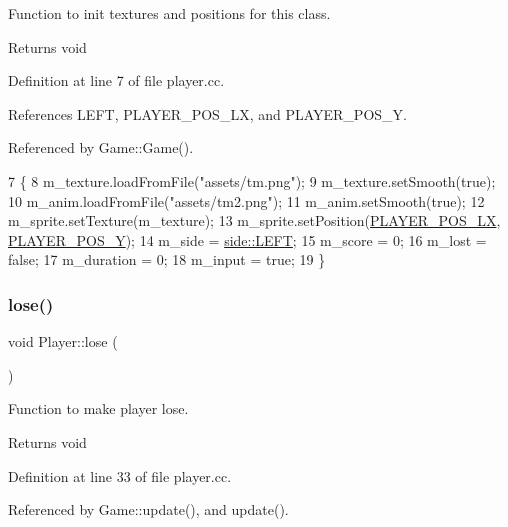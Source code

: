 Function to init textures and positions for this class. 

\begin{DoxyReturn}{Returns}
void 
\end{DoxyReturn}


Definition at line 7 of file player.\+cc.



References L\+E\+FT, P\+L\+A\+Y\+E\+R\+\_\+\+P\+O\+S\+\_\+\+LX, and P\+L\+A\+Y\+E\+R\+\_\+\+P\+O\+S\+\_\+Y.



Referenced by Game\+::\+Game().


\begin{DoxyCode}
7                   \{
8     m\_texture.loadFromFile(\textcolor{stringliteral}{"assets/tm.png"});
9     m\_texture.setSmooth(\textcolor{keyword}{true});
10     m\_anim.loadFromFile(\textcolor{stringliteral}{"assets/tm2.png"});
11     m\_anim.setSmooth(\textcolor{keyword}{true});
12     m\_sprite.setTexture(m\_texture);
13     m\_sprite.setPosition(\hyperlink{player_8h_ac5c27f8ceb9550dd92443cd00605dc3e}{PLAYER\_POS\_LX}, \hyperlink{player_8h_a23e4a20c724cefdd69b13c2826a8c12f}{PLAYER\_POS\_Y});
14     m\_side = \hyperlink{assets_8h_afc015eff6557e84151d2e53b94375445a684d325a7303f52e64011467ff5c5758}{side::LEFT};
15     m\_score = 0;
16     m\_lost = \textcolor{keyword}{false};
17     m\_duration = 0;
18     m\_input = \textcolor{keyword}{true};
19 \}
\end{DoxyCode}
\mbox{\label{class_player_af1ae3d8d7e22c5502d0380c16c7329ef}} 
\subsubsection{\texorpdfstring{lose()}{lose()}}
{\footnotesize\ttfamily void Player\+::lose (\begin{DoxyParamCaption}{ }\end{DoxyParamCaption})}



Function to make player lose. 

\begin{DoxyReturn}{Returns}
void 
\end{DoxyReturn}


Definition at line 33 of file player.\+cc.



Referenced by Game\+::update(), and update().


